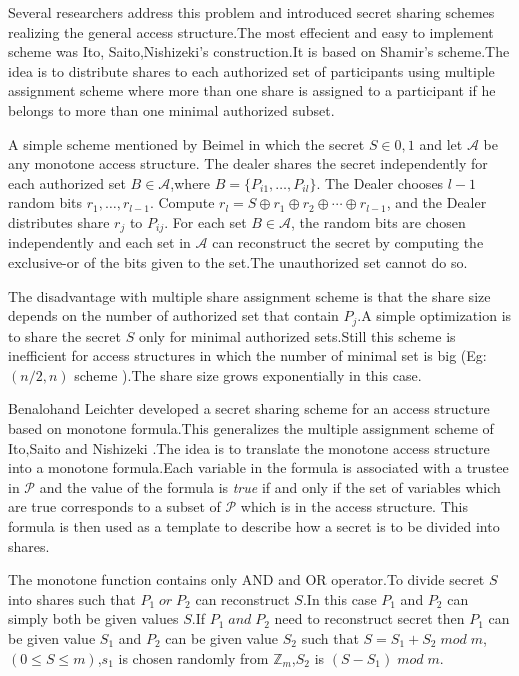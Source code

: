\documentclass{llncs}
\begin{document}
Several researchers address this problem and introduced secret sharing schemes realizing the general access structure.The most effecient and easy to implement scheme was Ito, Saito,Nishizeki's \cite{ito1989secret} construction.It is based on Shamir's scheme.The idea is to  distribute shares to each authorized set of participants using multiple assignment scheme where more than one share is assigned to a participant if he belongs to more than one minimal authorized subset.

A simple scheme mentioned by Beimel \cite{beimel2011secret} in which the secret $S \in {0,1}$ and let $ \mathcal{A}$ be any monotone access structure. The dealer shares the secret independently for each authorized set
$ B \in \mathcal{A} $,where $B=\{P_{i1},\ldots,P_{il}\}$.     
The Dealer chooses $l-1$ random bits $r_{1},\ldots,r_{l-1}$.
Compute $r_{l}= S \oplus r_{1} \oplus r_{2} \oplus \cdots \oplus r_{l-1}$, and the Dealer distributes share $r_{j}$ to $P_{ij}$.
For each set $ B \in \mathcal {A}$, the random bits are chosen independently and each set in $\mathcal{A}$ can reconstruct the secret by computing the exclusive-or of the bits given to the set.The unauthorized set cannot do so.
    
The disadvantage with multiple share assignment scheme is that the share size depends on the number of authorized set that contain $P_{j}$.A simple optimization is to share the secret $S$ only for minimal authorized sets.Still this scheme is inefficient for access structures in which the number of minimal set is big (Eg:$(n/2,n)$ scheme ).The share size grows exponentially in this case.
     
Benalohand Leichter \cite{benaloh1990generalized} developed a secret sharing scheme for an access structure based on monotone formula.This generalizes the multiple assignment scheme of Ito,Saito and Nishizeki \cite{ito1989secret}.The idea is to translate the monotone access structure into a monotone formula.Each variable in the formula is associated with a trustee in $\mathcal{P}$ and the value of the formula is \textit{true} if and only if the set of variables which are true corresponds to a subset of $\mathcal{P}$ which is in the access structure. This formula is then used as a template to describe how a secret is to be divided into shares.
    
The monotone function contains only AND and OR operator.To divide secret $S$ into shares such that  $P_{1} \; or \; P_{2}$ can reconstruct $S$.In this case $P_{1}$ and  $P_{2}$ can simply both be given values $S$.If $P_{1} \; and \; P_{2}$ need to reconstruct secret then $P_{1}$ can be given value $S_{1}$ and $P_{2}$ can be given value $S_{2}$ such that $S=S_{1}+S_{2} \;mod \; m$,$(0 \le S \le m)$,$s_{1}$ is chosen randomly from $\mathbb{Z}_{m}$,$S_{2}$ is $(S-S_{1}) \; mod \; m$.
    
\end{document}
